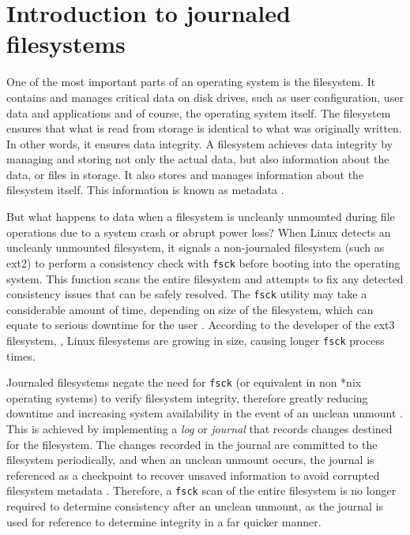 \section{Introduction to journaled filesystems}

One of the most important parts of an operating system is the filesystem. It contains and manages critical data on disk drives, such as user configuration, user data and applications and of course, the operating system itself. The filesystem ensures that what is read from storage is identical to what was originally written. In other words, it ensures data integrity. A filesystem achieves data integrity by managing and storing not only the actual data, but also information about the data, or files in storage. It also stores and manages information about the filesystem itself. This information is known as metadata \citep{Best2002}.

But what happens to data when a filesystem is uncleanly unmounted during file operations due to a system crash or abrupt power loss? When Linux detects an uncleanly unmounted filesystem, it signals a non-journaled filesystem (such as ext2) to perform a consistency check with \texttt{fsck} before booting into the operating system. This function scans the entire filesystem and attempts to fix any detected consistency issues that can be safely resolved. The \texttt{fsck} utility may take a considerable amount of time, depending on size of the filesystem, which can equate to serious downtime for the user \citep{Jones2008}. According to the developer of the ext3 filesystem, \citet{Tweedie2000}, Linux filesystems are growing in size, causing longer \texttt{fsck} process times.

Journaled filesystems negate the need for \texttt{fsck} (or equivalent in non *nix operating systems) to verify filesystem integrity, therefore greatly reducing downtime and increasing system availability in the event of an unclean unmount \citep{Best2002, Bost2012, Jones2008, Prabhakaran2005a, Tweedie1998, Tweedie2000}. This is achieved by implementing a \emph{log} or \emph{journal} that records changes destined for the filesystem. The changes recorded in the journal are committed to the filesystem periodically, and when an unclean unmount occurs, the journal is referenced as a checkpoint to recover unsaved information to avoid corrupted filesystem metadata \citep{Jones2008}. Therefore, a \texttt{fsck} scan of the entire filesystem is no longer required to determine consistency after an unclean unmount, as the journal is used for reference to determine integrity in a far quicker manner.